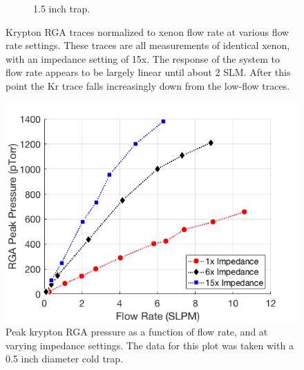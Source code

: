 \begin{figure}[h!]
\begin{subfigure}{0.5\textwidth}
  \caption{1.5 inch trap.}
  \label{fig:flow_traces_1p5}
\end{subfigure}
\caption{Krypton RGA traces normalized to xenon flow rate at various flow rate settings. These traces are all measurements of identical xenon, with an impedance setting of 15x. The response of the system to flow rate appears to be largely linear until about 2 SLM. After this point the Kr trace falls increasingly down from the low-flow traces.} 
\label{fig:flow_traces}
\end{figure}
\begin{figure}[h]
  \includegraphics[width=\linewidth]{Figures/FlowResponse.png}
  \caption{Peak krypton RGA pressure as a function of flow rate, and at varying impedance settings. The data for this plot was taken with a 0.5 inch diameter cold trap.}
  \label{fig:RGAtrace_ideal}
\end{figure}

